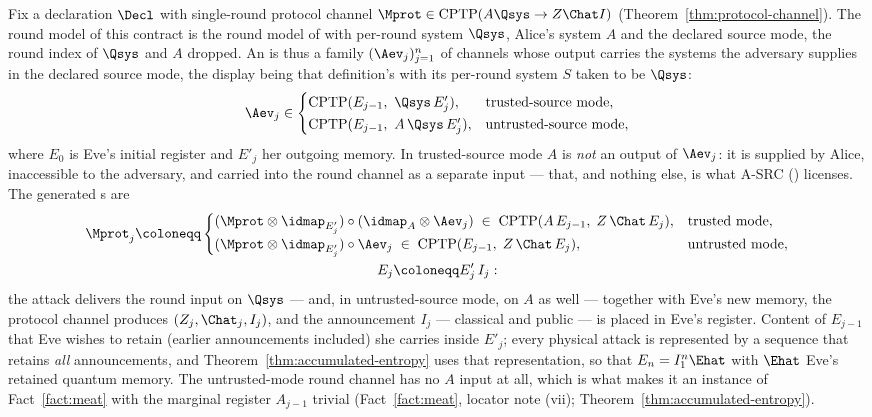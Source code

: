 \begin{definition}
\label{def:roundmodel}
Fix a declaration $\Decl$ with single-round protocol channel
$\Mprot\in\mathrm{CPTP}(A\Qsys\to Z\Chat I)$ (Theorem~\ref{thm:protocol-channel}).
The round model of this contract is the round model of
 with per-round system $\Qsys$, Alice's
system $A$ and the declared source mode, the round index of $\Qsys$ and $A$
dropped. An  is thus a family $(\Aev_j)_{j=1}^{n}$ of
channels whose output carries the systems the adversary supplies in the
declared source mode, the display being that definition's with its
per-round system $S$ taken to be $\Qsys$:
\begin{equation}\label{eq:attackchannel}
  \Aev_j\in
  \begin{cases}
    \mathrm{CPTP}(E_{j-1},\ \Qsys\,E'_j), &
      \text{trusted-source mode},\\[0.3ex]
    \mathrm{CPTP}(E_{j-1},\ A\,\Qsys\,E'_j), &
      \text{untrusted-source mode},
  \end{cases}
\end{equation}
where $E_0$ is Eve's initial register and $E'_j$ her outgoing memory. In
trusted-source mode $A$ is \emph{not} an output of $\Aev_j$: it is
supplied by Alice, inaccessible to the adversary, and carried into the
round channel as a separate input --- that, and nothing else, is what
A-SRC () licenses. The generated
s
are
\begin{equation}\label{eq:roundchannel}
\begin{gathered}
  \Mprot_j\coloneqq
  \begin{cases}
    (\Mprot\otimes\idmap_{E'_j})\circ(\idmap_{A}\otimes\Aev_j)
      \;\in\;\mathrm{CPTP}(A\,E_{j-1},\;Z\,\Chat\,E_j), &
      \text{trusted mode},\\[0.5ex]
    (\Mprot\otimes\idmap_{E'_j})\circ\Aev_j
      \;\in\;\mathrm{CPTP}(E_{j-1},\;Z\,\Chat\,E_j), &
      \text{untrusted mode},
  \end{cases}\\
  E_j\coloneqq E'_j\,I_j:
\end{gathered}
\end{equation}
the attack delivers the round input on $\Qsys$ --- and, in
untrusted-source mode, on $A$ as well --- together with Eve's
new memory, the protocol channel produces $(Z_j,\Chat_j,I_j)$, and the
announcement $I_j$ --- classical and public --- is placed in Eve's
register. Content of $E_{j-1}$ that Eve wishes to retain (earlier
announcements included) she carries inside $E'_j$; every physical
attack is represented by a sequence that retains \emph{all}
announcements, and Theorem~\ref{thm:accumulated-entropy} uses that representation, so
that $E_n=I_1^n\Ehat$ with $\Ehat$ Eve's retained quantum memory. The
untrusted-mode round channel has no $A$ input at all, which is what
makes it an instance of Fact~\ref{fact:meat} with the marginal
register $A_{j-1}$ trivial (Fact~\ref{fact:meat}, locator note (vii);
Theorem~\ref{thm:accumulated-entropy}).


\end{definition}
